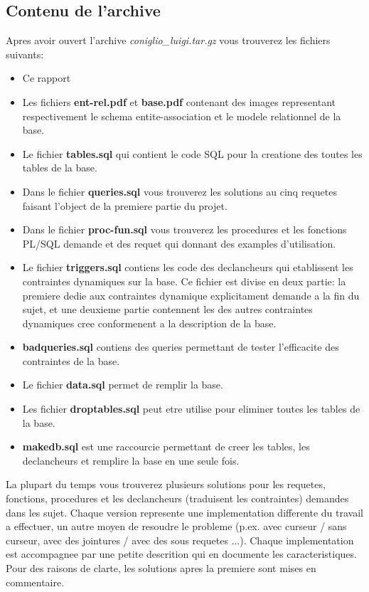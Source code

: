 \documentclass[twoside,openright,a4paper,11pt,french]{article}
\begin{document}
\subsection{Contenu de l'archive}
Apres avoir ouvert l'archive {\it coniglio\_luigi.tar.gz} vous
trouverez les fichiers suivants:
\smallbreak
\begin{itemize}
\item Ce rapport
\item Les fichiers {\bf ent-rel.pdf} et {\bf base.pdf} contenant
      des images representant respectivement le schema entite-association
      et le modele relationnel de la base.
\item Le fichier {\bf tables.sql} qui contient le code SQL pour la
      creatione des toutes les tables de la base.
\item Dans le fichier {\bf queries.sql} vous trouverez les solutions
      au cinq requetes faisant l'object de la premiere partie du projet.
\item Dans le fichier {\bf proc-fun.sql} vous trouverez les procedures
      et les fonctions PL/SQL demande et des requet qui donnant des 
      examples d'utilisation.
\item Le fichier {\bf triggers.sql} contiens les code des declancheurs qui
      etablissent les contraintes dynamiques sur la base.  Ce fichier est divise en
      deux partie: la premiere dedie aux contraintes dynamique explicitament
      demande a la fin du sujet, et une deuxieme partie contennent les
      des autres contraintes dynamiques cree conformenent a la description de la
      base.
\item {\bf badqueries.sql} contiens des queries permettant de tester l'efficacite 
      des contraintes de la base.
\item Le fichier {\bf data.sql} permet de remplir la base.
\item Les fichier {\bf droptables.sql} peut etre utilise pour eliminer toutes 
      les tables de la base.
\item {\bf makedb.sql} est une raccourcie permettant de creer les tables, les
      declancheurs et remplire la base en une seule fois.
\end{itemize}

\bigbreak
La plupart du temps vous trouverez plusieurs solutions pour les requetes,
fonctions, procedures et les declancheurs (traduisent les contraintes) demandes
dans les sujet. Chaque version represente une implementation differente du
travail a effectuer, un autre moyen de resoudre le probleme  (p.ex. avec
curseur / sans curseur, avec des jointures / avec des sous requetes ...).
Chaque implementation est accompagnee par une petite descrition qui en
documente les caracteristiques.  Pour des raisons de clarte, les solutions
apres la premiere sont mises en commentaire. 
\end{document}
